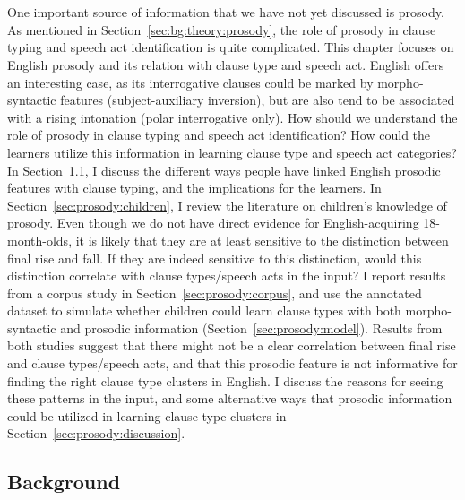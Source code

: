
\chapter{}
\label{chap:prosody}
One important source of information that we have not yet discussed is prosody. As mentioned in Section~\ref{sec:bg:theory:prosody}, the role of prosody in clause typing and speech act identification is quite complicated. This chapter focuses on English prosody and its relation with clause type and speech act. English offers an interesting case, as its interrogative clauses could be marked by morpho-syntactic features (subject-auxiliary inversion), but are also tend to be associated with a rising intonation (polar interrogative only). How should we understand the role of prosody in clause typing and speech act identification? How could the learners utilize this information in learning clause type and speech act categories? In Section~\ref{sec:prosody:bg}, I discuss the different ways people have linked English prosodic features with clause typing, and the implications for the learners. In Section~\ref{sec:prosody:children}, I review the literature on children's knowledge of prosody. Even though we do not have direct evidence for English-acquiring 18-month-olds, it is likely that they are at least sensitive to the distinction between final rise and fall. If they are indeed sensitive to this distinction, would this distinction correlate with clause types/speech acts in the input? I report results from a corpus study in Section~\ref{sec:prosody:corpus}, and use the annotated dataset to simulate whether children could learn clause types with both morpho-syntactic and prosodic information (Section~\ref{sec:prosody:model}). Results from both studies suggest that there might not be a clear correlation between final rise and clause types/speech acts, and that this prosodic feature is not informative for finding the right clause type clusters in English. I discuss the reasons for seeing these patterns in the input, and some alternative ways that prosodic information could be utilized in learning clause type clusters in Section~\ref{sec:prosody:discussion}.


\section{Background}
\label{sec:prosody:bg}

